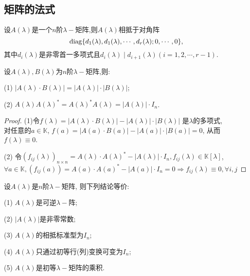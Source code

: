 \subsection{矩阵的法式}
\begin{theorem}\label{thm:model1}
  设$A(\lambda)$是一个$n$阶$\lambda-$矩阵,则$A(\lambda)$相抵于对角阵
  \begin{equation*}
    \operatorname{diag}\{d_1(\lambda),d_1(\lambda),\cdots,d_r(\lambda);0,\cdots,0\},
  \end{equation*}
  其中$d_i(\lambda)$是非零首一多项式且$d_i(\lambda)\mid d_{i+1}(\lambda) (i=1,2,\cdots,r-1)$.
\end{theorem}
\begin{theory}\label{thr:model1}
  设$A(\lambda),B(\lambda)$为$n$阶$\lambda-$矩阵,则:

  (1) $|A(\lambda)\cdot B(\lambda)|=|A(\lambda)|\cdot |B(\lambda)|$;

  (2) $A(\lambda)A(\lambda)^*=A(\lambda)^*A(\lambda)=|A(\lambda)|\cdot I_n$.
\end{theory}
\begin{proof}
  (1)令$f(\lambda)=|A(\lambda)\cdot B(\lambda)|-|A(\lambda)|\cdot |B(\lambda)|$
  是$\lambda$的多项式,\\
  对任意的$a \in \mathbb{K}$,
  $f(a)=|A(a)\cdot B(a)|-|A(a)|\cdot |B(a)| = 0$,
  从而$f(\lambda) \equiv 0$.

  (2) 令$(f_{ij}(\lambda))_{n\times n}=A(\lambda)\cdot A(\lambda)^* -
  |A(\lambda)|\cdot I_n, f_{ij}(\lambda) \in \mathbb{K}[\lambda]$, \\
  $\forall a \in \mathbb{K},
  (f_{ij}(a)) = A(a)\cdot A(a)^* -
  |A(a)|\cdot I_n = 0 \Longrightarrow f_{ij}(\lambda) \equiv 0, \forall i,j$
\end{proof}
\begin{theorem}
  设$A(\lambda)$是$n$阶$\lambda-$矩阵,
  则下列结论等价:

  (1) $A(\lambda)$是可逆$\lambda-$阵;

  (2) $|A(\lambda)|$是非零常数;

  (3) $A(\lambda)$的相抵标准型为$I_n$;

  (4) $A(\lambda)$只通过初等行(列)变换可变为$I_n$;

  (5) $A(\lambda)$是初等$\lambda-$矩阵的乘积.
\end{theorem}
